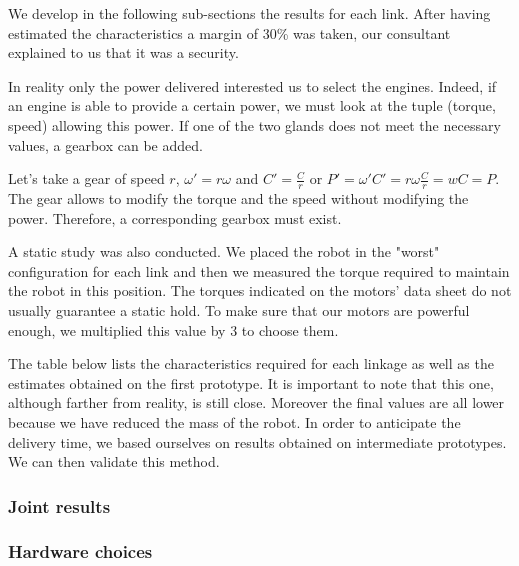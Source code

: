 \bigbreak
We develop in the following sub-sections the results for each link. After having estimated the characteristics a margin of 30\% was taken, our consultant explained to us that it was a security. 

\bigbreak
In reality only the power delivered interested us to select the engines. Indeed, if an engine is able to provide a certain power, we must look at the tuple (torque, speed) allowing this power. If one of the two glands does not meet the necessary values, a gearbox can be added. 

\bigbreak
Let's take a gear of speed $r$, $\omega'= r\omega$ and $C'= \frac{C}{r}$ or $P'= \omega'C'=r\omega\frac{C}{r} = wC = P$. The gear allows to modify the torque and the speed without modifying the power. Therefore, a corresponding gearbox must exist.

\bigbreak
A static study was also conducted. We placed the robot in the "worst" configuration for each link and then we measured the torque required to maintain the robot in this position. The torques indicated on the motors' data sheet do not usually guarantee a static hold. To make sure that our motors are powerful enough, we multiplied this value by 3 to choose them. 

\bigbreak
The table below lists the characteristics required for each linkage as well as the estimates obtained on the first prototype. It is important to note that this one, although farther from reality, is still close. Moreover the final values are all lower because we have reduced the mass of the robot. In order to anticipate the delivery time, we based ourselves on results obtained on intermediate prototypes. We can then validate this method. 

\subsubsection{Joint results}

\subsubsection{Hardware choices}